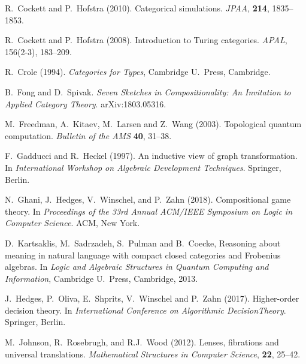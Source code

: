 \documentclass[12pt]{amsart}
\begin{document}
\begin{thebibliography}{99}
 R.\ Cockett and P.\ Hofstra (2010). Categorical
  simulations. \textsl{JPAA}, \textbf{214}, 1835--1853. 

 R.\ Cockett and P.\ Hofstra (2008). Introduction to
  Turing categories. \textsl{APAL}, 156(2-3), 183--209.

 R.\ Crole (1994). \textsl{Categories for Types}, Cambridge U.\ Press, Cambridge.
  
 B.\ Fong and D.\ Spivak. \textsl{Seven Sketches in
    Compositionality: An Invitation to Applied Category Theory}.
  arXiv:1803.05316.

 M.\ Freedman, A.\ Kitaev, M.\ Larsen and Z.\ Wang
  (2003). Topological quantum computation. \textsl{Bulletin of the AMS}
  \textbf{40}, 31–38.  %
    
 F.\ Gadducci and R.\ Heckel (1997). An inductive view of
  graph transformation. In \emph{International Workshop on Algebraic
    Development Techniques}. Springer, Berlin.

  N.\ Ghani, J.\  Hedges, V.\ Winschel, and P.\ Zahn (2018).  Compositional game theory. In \textsl{Proceedings of the 33rd Annual ACM/IEEE Symposium on Logic in Computer Science}. ACM, New York.


  D.\ Kartsaklis, M.\ Sadrzadeh, S.\ Pulman and B.\ Coecke, Reasoning about meaning in natural language with compact closed categories and Frobenius algebras.  In \textsl{Logic and Algebraic Structures in Quantum Computing and Information}, Cambridge U.\ Press, Cambridge, 2013.   %

  J.\ Hedges, P.\ Oliva, E.\ Shprits, V.\ Winschel and
  P.\ Zahn (2017). Higher-order decision theory. In \textsl{International 
  Conference on Algorithmic DecisionTheory}. Springer, Berlin.

 M.\ Johnson, R.\ Rosebrugh, and R.J.\ Wood (2012). Lenses, fibrations and universal translations. \textsl{Mathematical Structures in Computer Science}, \textbf{22}, 25--42.


\end{thebibliography}
\end{document}
